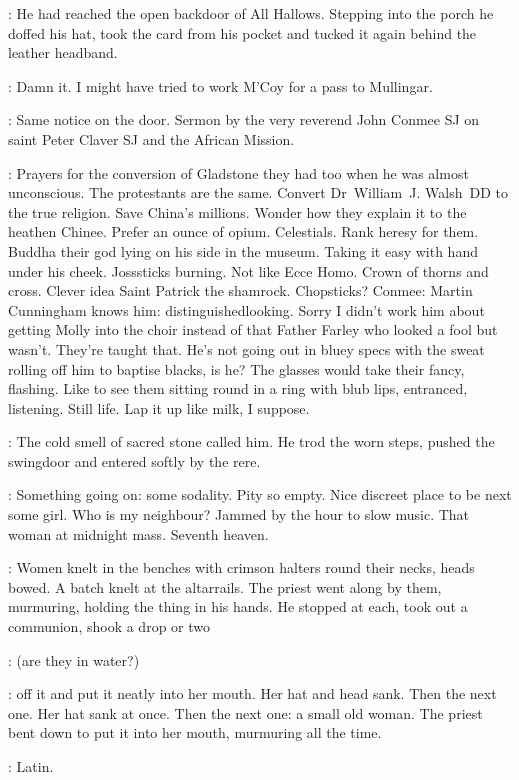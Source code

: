 :
He had reached the open backdoor of All Hallows.
Stepping into the porch
he doffed his hat,
took the card from his pocket
and tucked it again behind the leather headband.

\BloomInt:
Damn it.
I might have tried to work M'Coy for a pass to Mullingar.

:
Same notice on the door.
Sermon by the very reverend John Conmee SJ
on saint Peter Claver SJ and the African Mission.

\BloomInt:
Prayers for the conversion of Gladstone they had too
when he was almost unconscious.
The protestants are the same.
Convert Dr~William~J. Walsh~DD to the true religion.
Save China's millions.
Wonder how they explain it to the heathen Chinee.
Prefer an ounce of opium.
Celestials.
Rank heresy for them.
Buddha their god lying on his side in the museum.
Taking it easy
with hand under his cheek.
Josssticks burning.
Not like Ecce Homo.
Crown of thorns and cross.
Clever idea
Saint Patrick the shamrock.
Chopsticks?
Conmee:
Martin Cunningham knows him:
distinguishedlooking.
Sorry I didn't work him about getting Molly into the choir
instead of that Father Farley who looked a fool but wasn't.
They're taught that.
He's not going out in bluey specs
with the sweat rolling off him to baptise blacks,
is he?
The glasses would take their fancy, flashing.
Like to see them sitting round in a ring with blub lips,
entranced, listening.
Still life.
Lap it up like milk, I suppose.

:
The cold smell of sacred stone called him.
He trod the worn steps,
pushed the swingdoor
and entered softly by the rere.

\BloomInt:
Something going on: some sodality.
Pity so empty.
Nice discreet place to be next some girl.
Who is my neighbour?
Jammed by the hour to slow music.
That woman at midnight mass.
Seventh heaven.

:
Women knelt in the benches with crimson halters round their necks,
heads bowed.
A batch knelt at the altarrails.
The priest went along by them, murmuring,
holding the thing in his hands.
He stopped at each, took out a communion,
shook a drop or two

\BloomInt:
(are they in water?)

:
off it and put it neatly into her mouth.
Her hat and head sank.
Then the next one.
Her hat sank at once.
Then the next one:
a small old woman.
The priest bent down to put it into her mouth,
murmuring all the time.

\BloomInt:
Latin.

